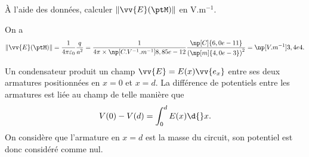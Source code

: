 \begin{enonce}
	À l'aide des données, calculer $\| \vv{E}(\ptM) \|$ en V.m$^{-1}$.
\end{enonce}


\begin{corrige}
On a 
	\[
		\| \vv{E}(\ptM) \| = \frac{1}{4\pi\varepsilon_0} \frac{q}{a^2} = \frac{1}{ 4\pi \times \np[C.V^{-1}.m^{-1}]{8,85e-12} } \frac{\np[C]{6,0e-11}}{\left(\np[m]{4,0e-3}\right)^2} = \np[V.m^{-1}]{3,4e4}.
	\]
\end{corrige}

\finEntrainement





\newpage







\hauteurLargeurCadreReponse		{7mm}{7cm}
\typeEntrainement				{} %
\initialisationEntrainement

Un condensateur produit un champ $\vv{E} = E(x)\vv{e_x}$ entre ses deux armatures positionnées en $x = 0$ et $x = d$. La différence de potentiels entre les armatures est liée au champ de telle manière que \vspace{-1mm}
\[
	V(0) - V(d) = \int_{0}^{d} E(x) \d{}x.\vspace{-1mm}
\]
On considère que l'armature en $x=d$ est la masse du circuit, son potentiel est donc considéré comme nul. 


